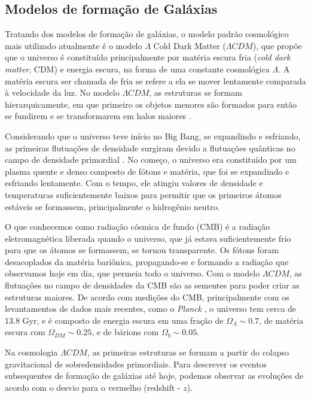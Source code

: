 \subsection{Modelos de formação de Galáxias}\label{subsec:modelo_formacao_galaxias}

Tratando dos modelos de formação de galáxias, o modelo padrão cosmológico mais utilizado atualmente é o modelo $\Lambda$ Cold Dark Matter ($\Lambda CDM$), que propõe que o universo é constituído principalmente por matéria escura fria ({\it cold dark matter}, CDM) e energia escura, na forma de uma constante cosmológica $\Lambda$. A matéria escura ser chamada de fria se refere a ela se mover lentamente comparada à velocidade da luz. No modelo $\Lambda CDM$, as estruturas se formam hierarquicamente, em que primeiro os objetos menores são formados para então se fundirem e se transformarem em halos maiores \citep{Blumenthal_1984}.

Considerando que o universo teve início no Big Bang, se expandindo e esfriando, as primeiras flutuações de densidade surgiram devido a flutuações quânticas no campo de densidade primordial \citep{liddle_1999}. No começo, o universo era constituído por um plasma quente e denso composto de fótons e matéria, que foi se expandindo e esfriando lentamente. Com o tempo, ele atingiu valores de densidade e temperaturas suficientemente baixos para permitir que os primeiros átomos estáveis se formassem, principalmente o hidrogênio neutro.

O que conhecemos como radiação cósmica de fundo (CMB) é a radiação eletromagnética liberada quando o universo, que já estava suficientemente frio para que os átomos se formassem, se tornou transparente. Os fótons foram desacoplados da matéria bariônica, propagando-se e formando a radiação que observamos hoje em dia, que permeia todo o universo. Com o modelo $\Lambda CDM$, as flutuações no campo de densidades da CMB são as sementes para poder criar as estruturas maiores. De acordo com medições do CMB, principalmente com os levantamentos de dados mais recentes, como o \textit{Planck} \citep{Planck_2020}, o universo tem cerca de 13.8 Gyr, e é composto de energia escura em uma fração de $\Omega_\Lambda \sim 0.7$, de matéria escura com $\Omega_{DM} \sim 0.25$, e de bárions com $\Omega_b \sim 0.05$.

Na cosmologia $\Lambda CDM$, as primeiras estruturas se formam a partir do colapso gravitacional de sobredensidades primordiais. Para descrever os eventos subsequentes de formação de galáxias até hoje, podemos observar as evoluções de acordo com o desvio para o vermelho (redshift - $z$).

